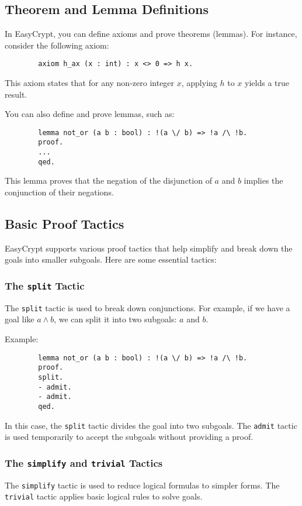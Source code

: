 \documentclass{article}
\begin{document}
	\subsection{Theorem and Lemma Definitions}
	
	In EasyCrypt, you can define axioms and prove theorems (lemmas). For instance, consider the following axiom:
	\begin{verbatim}
		axiom h_ax (x : int) : x <> 0 => h x.
	\end{verbatim}
	This axiom states that for any non-zero integer \( x \), applying \( h \) to \( x \) yields a true result.
	
	You can also define and prove lemmas, such as:
	\begin{verbatim}
		lemma not_or (a b : bool) : !(a \/ b) => !a /\ !b.
		proof.
		...
		qed.
	\end{verbatim}
	This lemma proves that the negation of the disjunction of \(a\) and \(b\) implies the conjunction of their negations.
	
	\subsection{Basic Proof Tactics}
	
	EasyCrypt supports various proof tactics that help simplify and break down the goals into smaller subgoals. Here are some essential tactics:
	
	\subsubsection{The \texttt{split} Tactic}
	The \texttt{split} tactic is used to break down conjunctions. For example, if we have a goal like \( a \land b \), we can split it into two subgoals: \( a \) and \( b \).
	
	Example:
	\begin{verbatim}
		lemma not_or (a b : bool) : !(a \/ b) => !a /\ !b.
		proof.
		split.
		- admit.
		- admit.
		qed.
	\end{verbatim}
	
	In this case, the \texttt{split} tactic divides the goal into two subgoals. The \texttt{admit} tactic is used temporarily to accept the subgoals without providing a proof.
	
	\subsubsection{The \texttt{simplify} and \texttt{trivial} Tactics}
	The \texttt{simplify} tactic is used to reduce logical formulas to simpler forms. The \texttt{trivial} tactic applies basic logical rules to solve goals.
	
\end{document}
